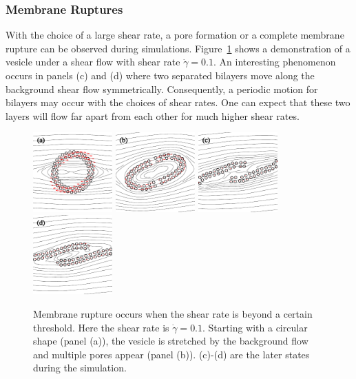 \documentclass[lineno]{jfm}
\begin{document}
\subsubsection{Membrane Ruptures}


With the choice of a large shear rate, a pore formation or a complete membrane rupture can be observed during simulations. Figure~\ref{figure7} shows a demonstration of a vesicle under a shear flow with shear rate $\dot\gamma=0.1$. An interesting phenomenon occurs in panels (c) and (d) where two separated bilayers move along the background shear flow symmetrically. Consequently, a periodic motion for bilayers may occur 
with the choices of shear rates. One can expect that these two layers will flow far apart from each other for much higher shear rates.



\begin{figure}
\centering
\includegraphics[height=1.2in]{N58_rupt_0.pdf}
\includegraphics[height=1.2in]{N58_rupt_200.pdf}
\includegraphics[height=1.2in]{N58_rupt_400.pdf}
\includegraphics[height=1.2in]{N58_rupt_600.pdf}
  \caption{Membrane rupture occurs when the shear rate is beyond a certain threshold. Here the shear rate is $\dot\gamma = 0.1$. Starting with a circular shape (panel (a)), the vesicle is stretched by the background flow and multiple pores appear (panel (b)). (c)-(d) are the later states during the simulation.
  }
    \label{figure7}
\end{figure}
\end{document}
